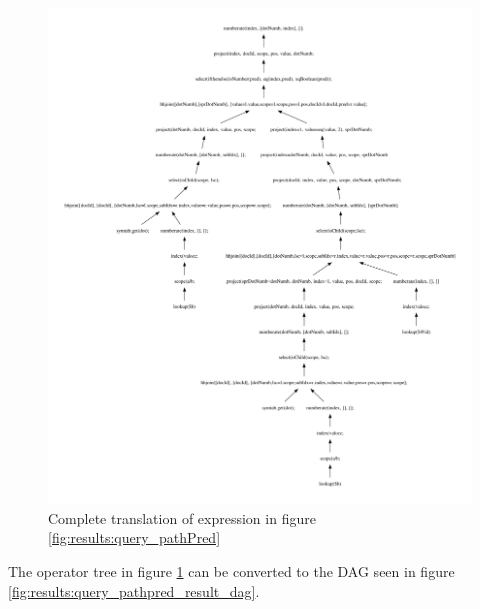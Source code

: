 \begin{figure}[!htp]
\begin{center}
  \includegraphics[width=1.0\textwidth]{img/graphs/TD_patExprPred}
  \caption{Complete translation of expression in figure
  \ref{fig:results:query_pathPred}}
  \label{fig:results:query_pathpred_result}
\end{center}
\end{figure}

The operator tree in figure \ref{fig:results:query_pathpred_result} can be
converted to the DAG seen in figure \ref{fig:results:query_pathpred_result_dag}.

\newpage

